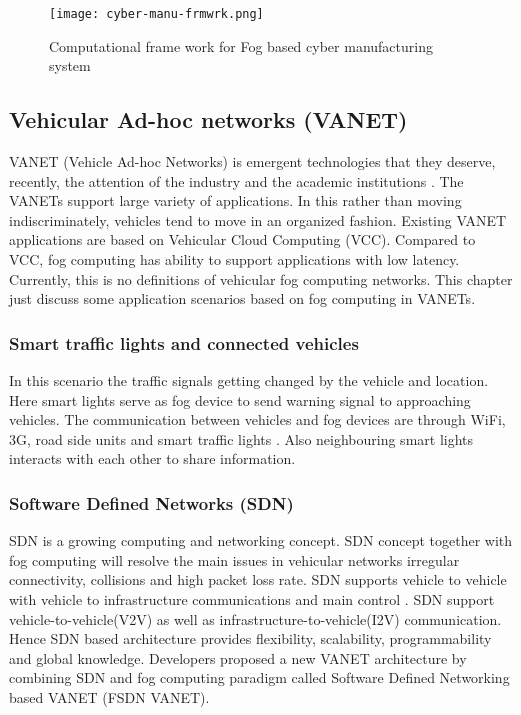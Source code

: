 \documentclass[10pt,a4paper,journal]{IEEEtran}
\begin{document}
\begin{figure}
  \centering
	\texttt{[image: cyber-manu-frmwrk.png]}
	\caption {Computational frame work for Fog based cyber manufacturing system  \cite{9}}
\label{Fig 4} 
\end{figure}

\subsection{Vehicular Ad-hoc networks (VANET)}
\hspace*{1em}	VANET (Vehicle Ad-hoc Networks) is emergent technologies that they deserve, recently, the attention of the industry and the academic institutions \cite{12}. The VANETs support large variety of applications. In this rather than moving indiscriminately, vehicles tend to move in an organized fashion. Existing VANET applications are based on Vehicular Cloud Computing (VCC). Compared to VCC, fog computing has ability to support applications with low latency. Currently, this is no definitions of vehicular fog computing networks. This chapter just discuss some application scenarios based on fog computing in VANETs. 


\subsubsection{Smart traffic lights and connected vehicles}
	In this scenario the traffic signals getting changed by the vehicle and location. Here smart lights serve as fog device to send warning signal to approaching vehicles. The communication between vehicles and fog devices are through WiFi, 3G, road side units and smart traffic lights \cite{13}. Also neighbouring smart lights interacts with each other to share information.
\subsubsection{Software Defined Networks (SDN)}
	SDN is a growing computing and networking concept. SDN concept together with fog computing will resolve the main issues in vehicular networks irregular connectivity, collisions and high packet loss rate. SDN supports vehicle to vehicle with vehicle to infrastructure communications and main control \cite{13}.
	SDN support vehicle-to-vehicle(V2V) as well as infrastructure-to-vehicle(I2V) communication. Hence SDN based architecture provides flexibility, scalability, programmability and global knowledge. Developers proposed a new VANET architecture by combining SDN and fog computing paradigm called Software Defined Networking based VANET (FSDN VANET).
\end{document}
